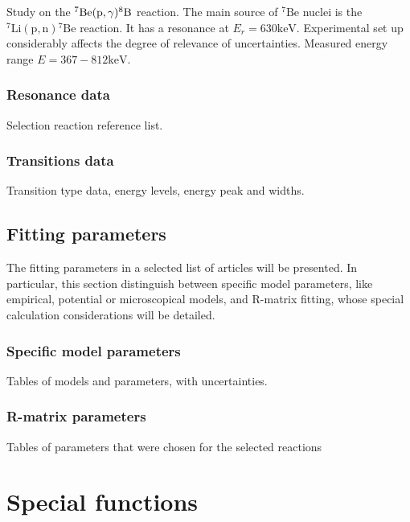 \documentclass[openany]{book}
\begin{document}
Study on the $\mathrm{{}^{7}Be(p, \gamma){}^{8}B}$ reaction. The main source of $\mathrm{{}^{7}Be}$ nuclei is the $\mathrm{{}^{7}Li(p, n){}^{7}Be}$ reaction. It has a resonance at $E_r = 630 \mathrm{keV}$. Experimental set up considerably affects the degree of relevance of uncertainties. Measured energy range $E = 367-812\mathrm{keV}$.

\subsection{Resonance data}  \label{sub:ResonanceData}

Selection reaction reference list.

\subsection{Transitions data} \label{sub:Transitions2Data}

Transition type data, energy levels, energy peak and widths.

\section{Fitting parameters} \label{sec:fittingParams}

The fitting parameters in a selected list of articles will be presented. In particular, this section distinguish between specific model parameters, like empirical, potential or microscopical models, and R-matrix fitting, whose special calculation considerations will be detailed.

\subsection{Specific model parameters} \label{sub:modelParameters}

Tables of models and parameters, with uncertainties. 

\subsection{R-matrix parameters} \label{sub:rmatrixParameters}

Tables of parameters that were chosen for the selected reactions

\chapter{Special functions} \label{ap:specialFunctions}
\end{document}
